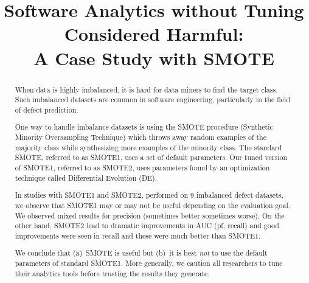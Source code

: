 \documentclass[10pt,conference]{IEEEtran}
\theoremstyle{break}
\theoremstyle{break}
\begin{document}
\pagestyle{plain}

\title{Software Analytics
without Tuning Considered Harmful:\\A
Case Study with SMOTE}

\author{
\and
{}
}
\maketitle






\begin{abstract}
When data is highly imbalanced, it is
hard for data miners to find the target
class. Such imbalanced datasets are
common in software engineering,
particularly in the field of defect prediction.


One way to handle imbalance datasets is using the SMOTE procedure (Synthetic Minority Oversampling Technique) which 
throws away random examples of the majority
class while synthesizing
more examples 
of the minority class.
The standard SMOTE,
referred to as SMOTE1,
uses a set of default parameters. Our tuned version
of SMOTE1, referred to as SMOTE2,
uses parameters  found by an optimization technique
called Differential Evolution (DE). 

 In studies with SMOTE1 and SMOTE2, performed on
 9 imbalanced defect datasets, we observe that SMOTE1 may or may not be useful depending on the evaluation goal. We observed mixed results for precision (sometimes better sometimes worse).
On the other hand, SMOTE2 lead to dramatic improvements in  AUC (pf, recall) and good improvements were seen in recall and these were much better than SMOTE1.

We conclude that (a)~SMOTE
is useful but (b)~it is best {\em not} to use the default parameters of standard SMOTE1. More generally, we caution all researchers to tune their analytics tools before
trusting the results they generate.
\end{abstract}
\end{document}
